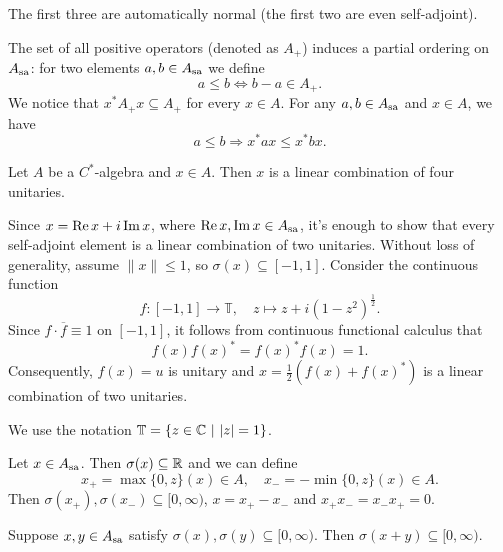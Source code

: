 \begin{remark}
  The first three are automatically normal (the first two are even self-adjoint).
\end{remark}

The set of all positive operators (denoted as $A_+$) induces a partial ordering on $A_{\operatorname{sa}}$: for two elements $a, b \in A_{\operatorname{sa}}$
we define $$a \leq b \Leftrightarrow b - a \in A_+.$$
We notice that $x^* A_+ x \subseteq A_+$ for every $x \in A$.
For any $a, b \in A_{\operatorname{sa}}$ and $x \in A$, we have 
$$a \leq b \Rightarrow x^* a x \leq x^* b x.$$

\begin{proposition}\label{prop:2.2}
  Let $A$ be a $C^*$-algebra and $x \in A$. Then $x$ is a linear combination of four unitaries.
\end{proposition}

\begin{myproof}
  Since $x = \operatorname{Re} x + i \operatorname{Im} x$, where $\operatorname{Re} x, \operatorname{Im} x \in A_{\operatorname{sa}}$,
  it's enough to show that every self-adjoint element is a linear combination of two unitaries.
  Without loss of generality, assume $\| x\| \leq 1$, so $\sigma(x) \subseteq [-1, 1]$.
  Consider the continuous function $$f: [-1, 1] \to \mathbb{T},\quad z \mapsto z + i(1 - z^2)^{\frac{1}{2}}.$$
  Since $f \cdot \overline{f} \equiv 1$ on $[-1, 1]$, it follows from continuous functional calculus that
  $$f(x) f(x)^* = f(x)^* f(x) = 1.$$
  Consequently, $f(x) = u$ is unitary and $x = \frac{1}{2} (f(x) + f(x)^*)$ is a linear combination of two unitaries. 
\end{myproof}

\begin{remark}
  We use the notation $\mathbb{T} = \{z \in \mathbb {C}\ |\ |z| = 1\}$.
\end{remark}

\begin{definition}\label{def:2.1}
  Let $x \in A_{\operatorname{sa}}$. Then $\sigma(x) \subseteq \mathbb {R}$ and we can define 
  $$x_+ = \max \{0, z\} (x) \in A,\quad x_- = - \min \{0, z\} (x) \in A.$$
  Then $\sigma(x_+), \sigma(x_- ) \subseteq [0, \infty)$, $x = x_+ - x_-$
  and $x_+ x_- = x_- x_+ = 0$.
\end{definition}

\begin{lemma}
  Suppose $x, y \in A_{\operatorname{sa}}$ satisfy $\sigma(x), \sigma(y) \subseteq [0, \infty)$.
  Then $\sigma(x + y) \subseteq [0, \infty)$.
\end{lemma}

